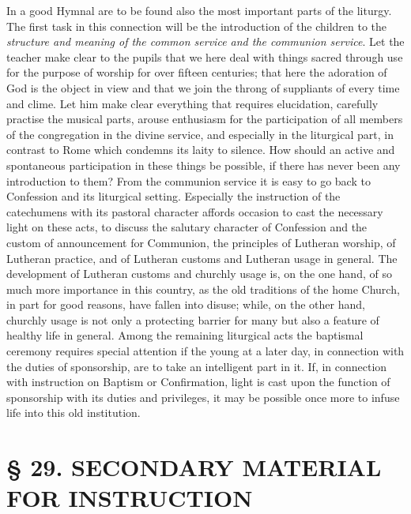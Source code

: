In a good Hymnal are to be found also the most important parts of the liturgy. The first task in this connection will be the introduction of the children to the \emph{structure and meaning of the common service and the communion service}. Let the teacher make clear to the pupils that we here deal with things sacred through use for the purpose of worship for over fifteen centuries; that here the adoration of God is the object in view and that we join the throng of suppliants of every time and clime. Let him make clear everything that requires elucidation, carefully practise the musical parts, arouse enthusiasm for the participation of all members of the congregation in the divine service, and especially in the liturgical part, in contrast to Rome which condemns its laity to silence. How should an active and spontaneous participation in these things be possible, if there has never been any introduction to them? From the communion service it is easy to go back to Confession and its liturgical setting. Especially the instruction of the catechumens with its pastoral character affords occasion to cast the necessary light on these acts, to discuss the salutary character of Confession and the custom of announcement for Communion, the principles of Lutheran worship, of Lutheran practice, and of Lutheran customs and Lutheran usage in general. The development of Lutheran customs and churchly usage is, on the one hand, of so much more importance in this country, as the old traditions of the home Church, in part for good reasons, have fallen into disuse; while, on the other hand, churchly usage is not only a protecting barrier for many but also a feature of healthy life in general. Among the remaining liturgical acts the baptismal ceremony requires special attention if the young at a later day, in connection with the
duties of sponsorship, are to take an intelligent part in it. If, in connection with instruction on Baptism or Confirmation, light is cast upon the function of sponsorship with its duties and privileges, it may be possible once more to infuse life into this old institution.

\chapter{§ 29. SECONDARY MATERIAL FOR INSTRUCTION}

